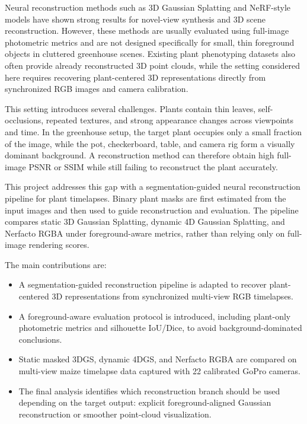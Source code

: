 \documentclass[sigconf]{acmart}
\begin{document}
Neural reconstruction methods such as 3D Gaussian Splatting and NeRF-style models have shown strong results for novel-view synthesis and 3D scene reconstruction. However, these methods are usually evaluated using full-image photometric metrics and are not designed specifically for small, thin foreground objects in cluttered greenhouse scenes. Existing plant phenotyping datasets also often provide already reconstructed 3D point clouds, while the setting considered here requires recovering plant-centered 3D representations directly from synchronized RGB images and camera calibration.

This setting introduces several challenges. Plants contain thin leaves, self-occlusions, repeated textures, and strong appearance changes across viewpoints and time. In the greenhouse setup, the target plant occupies only a small fraction of the image, while the pot, checkerboard, table, and camera rig form a visually dominant background. A reconstruction method can therefore obtain high full-image PSNR or SSIM while still failing to reconstruct the plant accurately.

This project addresses this gap with a segmentation-guided neural reconstruction pipeline for plant timelapses. Binary plant masks are first estimated from the input images and then used to guide reconstruction and evaluation. The pipeline compares static 3D Gaussian Splatting, dynamic 4D Gaussian Splatting, and Nerfacto RGBA under foreground-aware metrics, rather than relying only on full-image rendering scores.

The main contributions are:
\begin{itemize}
    \item A segmentation-guided reconstruction pipeline is adapted to recover plant-centered 3D representations from synchronized multi-view RGB timelapses.
    \item A foreground-aware evaluation protocol is introduced, including plant-only photometric metrics and silhouette IoU/Dice, to avoid background-dominated conclusions.
    \item Static masked 3DGS, dynamic 4DGS, and Nerfacto RGBA are compared on multi-view maize timelapse data captured with 22 calibrated GoPro cameras.
    \item The final analysis identifies which reconstruction branch should be used depending on the target output: explicit foreground-aligned Gaussian reconstruction or smoother point-cloud visualization.
\end{itemize}
\end{document}
